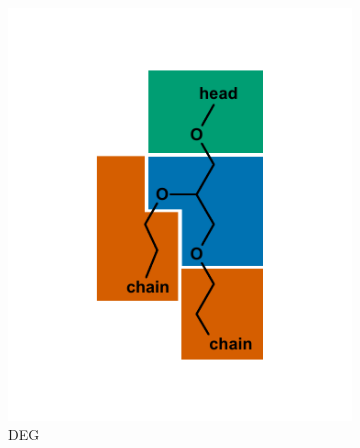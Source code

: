 
\singlespace
\begin{figure}[h]
\centering
    \begin{subfigure}[b]{.3\linewidth}
        	\includegraphics[width=1\linewidth]{figs_ch1/DEG}
        	\caption{DEG}
        \label{fig:DEG}
    \end{subfigure}
    \begin{subfigure}[b]{.3\linewidth}

\end{subfigure}
\end{figure}
